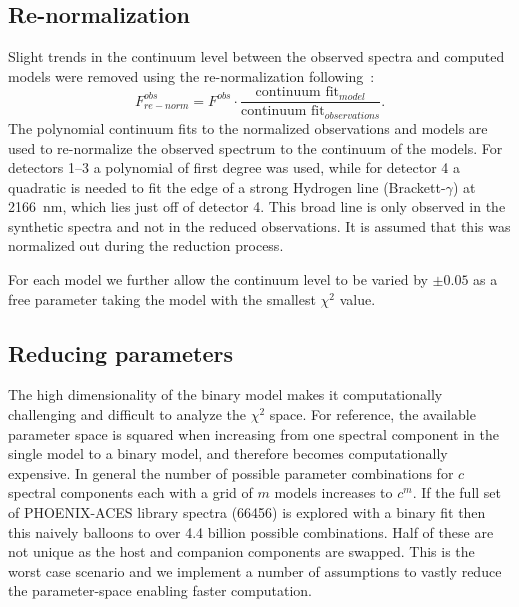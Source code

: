 \documentclass[fleqn,usenatbib]{mnras}
\begin{document}
\subsection{Re-normalization}
\label{subsec:renorm}
Slight trends in the continuum level between the observed spectra and computed models were removed using the re-normalization following~\citep{passegger_fundamental_2016}:
\begin{equation}
F^{obs}_{re-norm} = F^{obs} \cdot \frac{\textrm{continuum fit}_{model}}{\textrm{continuum fit}_{observations}}.
\end{equation}
The polynomial continuum fits to the normalized observations and models are used to re-normalize the observed spectrum to the continuum of the models. For detectors 1--3 a polynomial of first degree was used, while for detector 4 a quadratic is needed to fit the edge of a strong Hydrogen line (Brackett-\(\gamma\)) at 2166~nm, which lies just off of detector 4. This broad line is only observed in the synthetic spectra and not in the reduced observations. It is assumed that this was normalized out during the reduction process.

For each model we further allow the continuum level to be varied by \(\pm 0.05\) as a free parameter taking the model with the smallest \(\chi^2 \) value.


\subsection{Reducing parameters}
\label{subsec:reduce-params}
The high dimensionality of the binary model makes it computationally challenging and difficult to analyze the \(\chi^2\) space. 
For reference, the available parameter space is squared when increasing from one spectral component in the single model to a binary model, and therefore becomes computationally expensive. In general the number of possible parameter combinations for \(c\) spectral components each with a grid of \(m\) models increases to \(c^m\). If the full set of PHOENIX-ACES library spectra (66456) is explored with a binary fit then this naively balloons to over 4.4 billion possible combinations. Half of these are not unique as the host and companion components are swapped. This is the worst case scenario and we implement a number of assumptions to vastly reduce the parameter-space enabling faster computation.
\end{document}
